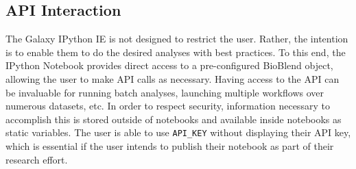 \documentclass{bioinfo}
\begin{document}
\begin{methods}
\subsection{API Interaction}
The Galaxy IPython IE is not designed to restrict the user. Rather, the intention is to enable
them to do the desired analyses with best practices. To this end, the IPython Notebook provides direct access to a pre-configured
BioBlend object, allowing the user to make API calls as necessary. Having access to the API can be invaluable for running
batch analyses, launching multiple workflows over numerous datasets, etc. In order to respect security, information necessary
to accomplish this is stored outside of notebooks and available inside notebooks as static variables. The user is able to use
\texttt{API\_KEY} without displaying their API key, which is essential if the user intends to publish their notebook as
part of their research effort.

%
%
%
%
%
%
%
%
%
%


\end{methods}
\end{document}
